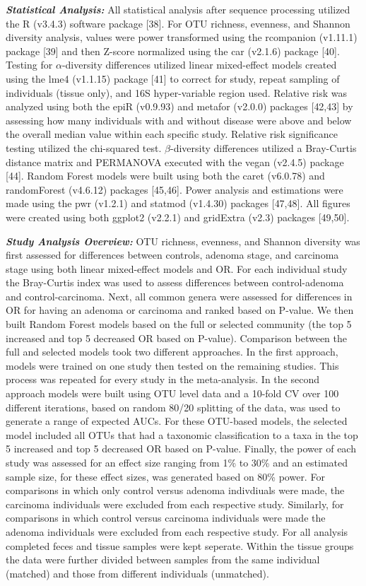\documentclass[12pt,]{article}
\begin{document}
\textbf{\emph{Statistical Analysis:}} All statistical analysis after
sequence processing utilized the R (v3.4.3) software package {[}38{]}.
For OTU richness, evenness, and Shannon diversity analysis, values were
power transformed using the rcompanion (v1.11.1) package {[}39{]} and
then Z-score normalized using the car (v2.1.6) package {[}40{]}. Testing
for \(\alpha\)-diversity differences utilized linear mixed-effect models
created using the lme4 (v1.1.15) package {[}41{]} to correct for study,
repeat sampling of individuals (tissue only), and 16S hyper-variable
region used. Relative risk was analyzed using both the epiR (v0.9.93)
and metafor (v2.0.0) packages {[}42,43{]} by assessing how many
individuals with and without disease were above and below the overall
median value within each specific study. Relative risk significance
testing utilized the chi-squared test. \(\beta\)-diversity differences
utilized a Bray-Curtis distance matrix and PERMANOVA executed with the
vegan (v2.4.5) package {[}44{]}. Random Forest models were built using
both the caret (v6.0.78) and randomForest (v4.6.12) packages
{[}45,46{]}. Power analysis and estimations were made using the pwr
(v1.2.1) and statmod (v1.4.30) packages {[}47,48{]}. All figures were
created using both ggplot2 (v2.2.1) and gridExtra (v2.3) packages
{[}49,50{]}.

\textbf{\emph{Study Analysis Overview:}} OTU richness, evenness, and
Shannon diversity was first assessed for differences between controls,
adenoma stage, and carcinoma stage using both linear mixed-effect models
and OR. For each individual study the Bray-Curtis index was used to
assess differences between control-adenoma and control-carcinoma. Next,
all common genera were assessed for differences in OR for having an
adenoma or carcinoma and ranked based on P-value. We then built Random
Forest models based on the full or selected community (the top 5
increased and top 5 decreased OR based on P-value). Comparison between
the full and selected models took two different approaches. In the first
approach, models were trained on one study then tested on the remaining
studies. This process was repeated for every study in the meta-analysis.
In the second approach models were built using OTU level data and a
10-fold CV over 100 different iterations, based on random 80/20
splitting of the data, was used to generate a range of expected AUCs.
For these OTU-based models, the selected model included all OTUs that
had a taxonomic classification to a taxa in the top 5 increased and top
5 decreased OR based on P-value. Finally, the power of each study was
assessed for an effect size ranging from 1\% to 30\% and an estimated
sample size, for these effect sizes, was generated based on 80\% power.
For comparisons in which only control versus adenoma indivdiuals were
made, the carcinoma individuals were excluded from each respective
study. Similarly, for comparisons in which control versus carcinoma
individuals were made the adenoma individuals were excluded from each
respective study. For all analysis completed feces and tissue samples
were kept seperate. Within the tissue groups the data were further
divided between samples from the same individual (matched) and those
from different individuals (unmatched).
\end{document}
